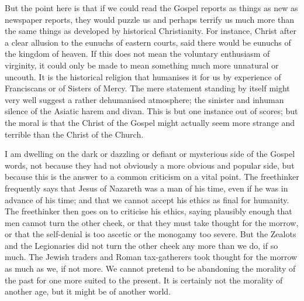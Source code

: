 But the point here is that if we could read the Gospel reports as things as new as newspaper reports, they would puzzle us and perhaps terrify us much more than the same things as developed by historical Christianity. For instance, Christ after a clear allusion to the eunuchs of eastern courts, said there would be eunuchs of the kingdom of heaven. If this does not mean the voluntary enthusiasm of virginity, it could only be made to mean something much more unnatural or uncouth. It is the historical religion that humanises it for us by experience of Franciscans or of Sisters of Mercy. The mere statement standing by itself might very well suggest a rather dehumanised atmosphere; the sinister and inhuman silence of the Asiatic harem and divan. This is but one instance out of scores; but the moral is that the Christ of the Gospel might actually seem more strange and terrible than the Christ of the Church.

I am dwelling on the dark or dazzling or defiant or mysterious side of the Gospel words, not because they had not obviously a more obvious and popular side, but because this is the answer to a common criticism on a vital point. The freethinker frequently says that Jesus of Nazareth was a man of his time, even if he was in advance of his time; and that we cannot accept his ethics as final for humanity. The freethinker then goes on to criticise his ethics, saying plausibly enough that men cannot turn the other cheek, or that they must take thought for the morrow, or that the self-denial is too ascetic or the monogamy too severe. But the Zealots and the Legionaries did not turn the other cheek any more than we do, if so much. The Jewish traders and Roman tax-gatherers took thought for the morrow as much as we, if not more. We cannot pretend to be abandoning the morality of the past for one more suited to the present. It is certainly not the morality of another age, but it might be of another world.

